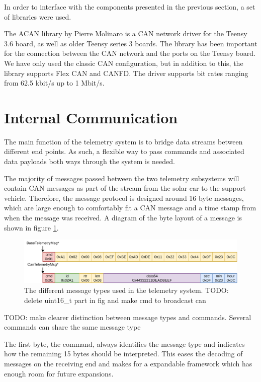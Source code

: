 \documentclass[conference]{IEEEtran}
\newcommand{\todo}[1]{{\color{olive} TODO: #1}}
\begin{document}
In order to interface with the components presented in the previous section, a set of libraries were used.

The ACAN library by Pierre Molinaro is a CAN network driver for the Teensy 3.6 board, as well as older Teensy series 3 boards. The library has been important for the connection between the CAN network and the ports on the Teensy board. We have only used the classic CAN configuration, but in addition to this, the library supports Flex CAN and CANFD. The driver supports bit rates ranging from 62.5 kbit/s up to 1 Mbit/s\cite{ACAN}.


% 

\section{Internal Communication}
The main function of the telemetry system is to bridge data streams between different end points. As such, a flexible way to pass commands and associated data payloads both ways through the system is needed. 

The majority of messages passed between the two telemetry subsystems will contain CAN messages as part of the stream from the solar car to the support vehicle. Therefore, the message protocol is designed around 16 byte messages, which are large enough to comfortably fit a CAN message and a time stamp from when the message was received. A diagram of the byte layout of a message is shown in figure \ref{fig:messageTypes}.

\begin{figure}
    \centering
    \includegraphics[width=\linewidth]{documentation/images/MessageTypes.pdf}
    \caption{The different message types used in the telemetry system.\todo{delete uint16\_t part in fig and make cmd to broadcast can}}
    \label{fig:messageTypes}
\end{figure}

\todo{make clearer distinction between message types and commands. Several commands can share the same message type}

The first byte, the command, always identifies the message type and indicates how the remaining 15 bytes should be interpreted. This eases the decoding of messages on the receiving end and makes for a expandable framework which has enough room for future expansions. 
\end{document}
